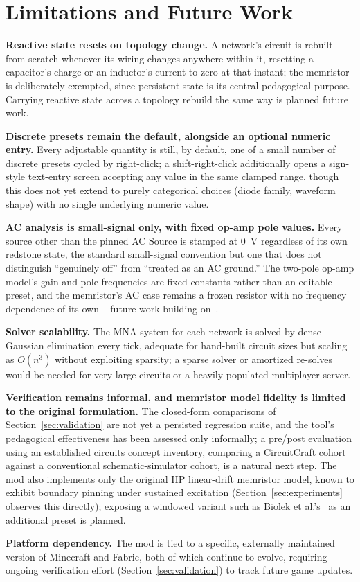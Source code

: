 \section{Limitations and Future Work}
\label{sec:limitations}

\textbf{Reactive state resets on topology change.} A network's circuit is rebuilt from
scratch whenever its wiring changes anywhere within it, resetting a capacitor's charge or an
inductor's current to zero at that instant; the memristor is deliberately exempted, since
persistent state is its central pedagogical purpose. Carrying reactive state across a
topology rebuild the same way is planned future work.

\textbf{Discrete presets remain the default, alongside an optional numeric entry.} Every
adjustable quantity is still, by default, one of a small number of discrete presets cycled by
right-click; a shift-right-click additionally opens a sign-style text-entry screen accepting
any value in the same clamped range, though this does not yet extend to purely categorical
choices (diode family, waveform shape) with no single underlying numeric value.

\textbf{AC analysis is small-signal only, with fixed op-amp pole values.} Every source other
than the pinned AC Source is stamped at 0~V regardless of its own redstone state, the
standard small-signal convention but one that does not distinguish ``genuinely off'' from
``treated as an AC ground.'' The two-pole op-amp model's gain and pole frequencies are fixed
constants rather than an editable preset, and the memristor's AC case remains a frozen
resistor with no frequency dependence of its own -- future work building
on~\cite{gater2026smallsignal,gater2025bodeplots}.

\textbf{Solver scalability.} The MNA system for each network is solved by dense Gaussian
elimination every tick, adequate for hand-built circuit sizes but scaling as $O(n^3)$ without
exploiting sparsity; a sparse solver or amortized re-solves would be needed for very large
circuits or a heavily populated multiplayer server.

\textbf{Verification remains informal, and memristor model fidelity is limited to the
original formulation.} The closed-form comparisons of Section~\ref{sec:validation} are not
yet a persisted regression suite, and the tool's pedagogical effectiveness has been assessed
only informally; a pre/post evaluation using an established circuits concept inventory,
comparing a CircuitCraft cohort against a conventional schematic-simulator cohort, is a
natural next step. The mod also implements only the original HP linear-drift memristor model,
known to exhibit boundary pinning under sustained excitation (Section~\ref{sec:experiments}
observes this directly); exposing a windowed variant such as Biolek et al.'s~\cite{biolek2009spice}
as an additional preset is planned.

\textbf{Platform dependency.} The mod is tied to a specific, externally maintained version of
Minecraft and Fabric, both of which continue to evolve, requiring ongoing verification effort
(Section~\ref{sec:validation}) to track future game updates.
